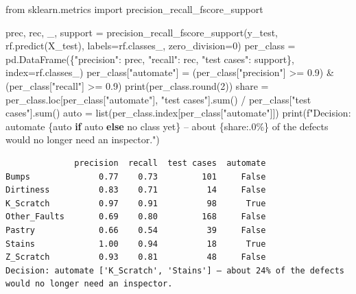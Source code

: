 \documentclass[
  letterpaper,
  DIV=11,
  numbers=noendperiod]{scrreprt}
\newenvironment{Shaded}{\begin{snugshade}}{\end{snugshade}}
\newcommand{\BuiltInTok}[1]{\textcolor[rgb]{0.00,0.23,0.31}{#1}}
\newcommand{\ControlFlowTok}[1]{\textcolor[rgb]{0.00,0.23,0.31}{\textbf{#1}}}
\newcommand{\DecValTok}[1]{\textcolor[rgb]{0.68,0.00,0.00}{#1}}
\newcommand{\FloatTok}[1]{\textcolor[rgb]{0.68,0.00,0.00}{#1}}
\newcommand{\ImportTok}[1]{\textcolor[rgb]{0.00,0.46,0.62}{#1}}
\newcommand{\NormalTok}[1]{\textcolor[rgb]{0.00,0.23,0.31}{#1}}
\newcommand{\OperatorTok}[1]{\textcolor[rgb]{0.37,0.37,0.37}{#1}}
\newcommand{\SpecialCharTok}[1]{\textcolor[rgb]{0.37,0.37,0.37}{#1}}
\newcommand{\SpecialStringTok}[1]{\textcolor[rgb]{0.13,0.47,0.30}{#1}}
\newcommand{\StringTok}[1]{\textcolor[rgb]{0.13,0.47,0.30}{#1}}
\begin{document}
\begin{Shaded}
\begin{Highlighting}[]
\ImportTok{from}\NormalTok{ sklearn.metrics }\ImportTok{import}\NormalTok{ precision\_recall\_fscore\_support}

\NormalTok{prec, rec, \_, support }\OperatorTok{=}\NormalTok{ precision\_recall\_fscore\_support(y\_test, rf.predict(X\_test), labels}\OperatorTok{=}\NormalTok{rf.classes\_, zero\_division}\OperatorTok{=}\DecValTok{0}\NormalTok{)}
\NormalTok{per\_class }\OperatorTok{=}\NormalTok{ pd.DataFrame(\{}\StringTok{"precision"}\NormalTok{: prec, }\StringTok{"recall"}\NormalTok{: rec, }\StringTok{"test cases"}\NormalTok{: support\}, index}\OperatorTok{=}\NormalTok{rf.classes\_)}
\NormalTok{per\_class[}\StringTok{"automate"}\NormalTok{] }\OperatorTok{=}\NormalTok{ (per\_class[}\StringTok{"precision"}\NormalTok{] }\OperatorTok{\textgreater{}=} \FloatTok{0.9}\NormalTok{) }\OperatorTok{\&}\NormalTok{ (per\_class[}\StringTok{"recall"}\NormalTok{] }\OperatorTok{\textgreater{}=} \FloatTok{0.9}\NormalTok{)}
\BuiltInTok{print}\NormalTok{(per\_class.}\BuiltInTok{round}\NormalTok{(}\DecValTok{2}\NormalTok{))}
\NormalTok{share }\OperatorTok{=}\NormalTok{ per\_class.loc[per\_class[}\StringTok{"automate"}\NormalTok{], }\StringTok{"test cases"}\NormalTok{].}\BuiltInTok{sum}\NormalTok{() }\OperatorTok{/}\NormalTok{ per\_class[}\StringTok{"test cases"}\NormalTok{].}\BuiltInTok{sum}\NormalTok{()}
\NormalTok{auto }\OperatorTok{=} \BuiltInTok{list}\NormalTok{(per\_class.index[per\_class[}\StringTok{"automate"}\NormalTok{]])}
\BuiltInTok{print}\NormalTok{(}\SpecialStringTok{f"Decision: automate }\SpecialCharTok{\{}\NormalTok{auto }\ControlFlowTok{if}\NormalTok{ auto }\ControlFlowTok{else} \StringTok{\textquotesingle{}no class yet\textquotesingle{}}\SpecialCharTok{\}}\SpecialStringTok{ – about }\SpecialCharTok{\{}\NormalTok{share}\SpecialCharTok{:.0\%\}}\SpecialStringTok{ of the defects would no longer need an inspector."}\NormalTok{)}
\end{Highlighting}
\end{Shaded}

\begin{verbatim}
              precision  recall  test cases  automate
Bumps              0.77    0.73         101     False
Dirtiness          0.83    0.71          14     False
K_Scratch          0.97    0.91          98      True
Other_Faults       0.69    0.80         168     False
Pastry             0.66    0.54          39     False
Stains             1.00    0.94          18      True
Z_Scratch          0.93    0.81          48     False
Decision: automate ['K_Scratch', 'Stains'] – about 24% of the defects would no longer need an inspector.
\end{verbatim}
\end{document}
